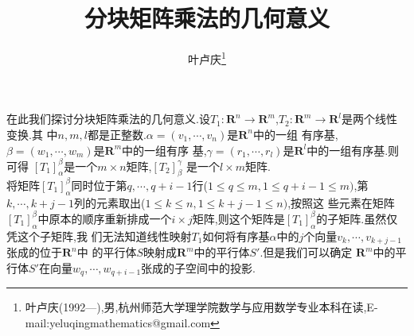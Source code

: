 \documentclass[a4paper]{article}
\begin{document}
\title{\huge{\bf{分块矩阵乘法的几何意义}}} \author{\small{叶卢庆\footnote{叶卢庆(1992---),男,杭州师范大学理学院数学与应用数学专业本科在读,E-mail:yeluqingmathematics@gmail.com}}}
\maketitle
在此我们探讨分块矩阵乘法的几何意义.设$T_{1}:\mathbf{R}^n\to
\mathbf{R}^m$,$T_2:\mathbf{R}^m\to \mathbf{R}^l$是两个线性变换.其
中$n,m,l$都是正整数.$\alpha=(v_1,\cdots,v_n)$是$\mathbf{R}^n$中的一组
有序基,$\beta=(w_1,\cdots,w_m)$是$\mathbf{R}^m$中的一组有序
基,$\gamma=(r_1,\cdots,r_l)$是$\mathbf{R}^l$中的一组有序基.则可得
$[T_1]_{\alpha}^{\beta}$是一个$m\times n$矩阵,$[T_2]_{\beta}^{\gamma}$
是一个$l\times m$矩阵.\\

将矩阵$[T_1]_{\alpha}^{\beta}$同时位于第$q,\cdots,q+i-1$行($1\leq q\leq
m,1\leq q+i-1\leq m)$,第
$k,\cdots,k+j-1$列的元素取出($1\leq k\leq n,1\leq k+j-1\leq n)$,按照这
些元素在矩阵$[T_1]_{\alpha}^{\beta}$中原本的顺序重新排成一个$i\times
j$矩阵,则这个矩阵是$[T_1]_{\alpha}^{\beta}$的子矩阵.虽然仅凭这个子矩阵,我
们无法知道线性映射$T_1$如何将有序基$\alpha$中的$j$个向量$v_k,\cdots,v_{k+j-1}$张成的位于$\mathbf{R}^n$中
的平行体$S$映射成$\mathbf{R}^m$中的平行体$S'$.但是我们可以确定
$\mathbf{R}^m$中的平行体$S'$在向量$w_q,\cdots,w_{q+i-1}$张成的子空间中的投影.
\end{document}
